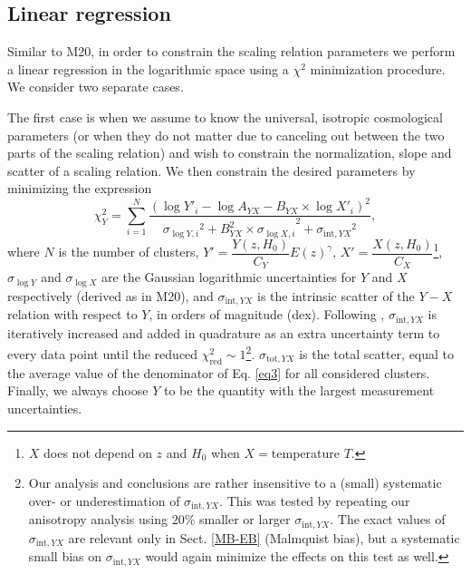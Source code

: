 \documentclass{aa}   %
\begin{document}
\subsection{Linear regression} \label{stat}

Similar to M20, in order to constrain the scaling relation parameters we perform a linear regression in the logarithmic space using a $\chi^2$ minimization procedure. We consider two separate cases. 

The first case is when we assume to know the universal, isotropic cosmological parameters (or when they do not matter due to canceling out between the two parts of the scaling relation) and wish to constrain the normalization, slope and scatter of a scaling relation. We then constrain the desired parameters by minimizing the expression
\begin{equation}
\chi^2_Y=\sum\limits_{i=1}^N\frac{\left(\log{Y'_i}-\log{A_{YX}}-B_{YX}\times \log{X'_i}\right)^2}{{\sigma _{\log{Y},i}}^2+{B_{YX}^2\times \sigma _{\log{X},i}}^2+{\sigma_{\text{int},YX}}^2},
\label{eq3}
\end{equation}
where $N$ is the number of clusters, $Y'=\dfrac{Y(z,H_0)}{C_{Y}}E(z)^{\gamma}$, $X'=\dfrac{X(z,H_0)}{C_{X}}$\footnote{$X$ does not depend on $z$ and $H_0$ when $X=$temperature $T$.}, $\sigma _{\log{Y}}$ and $\sigma _{\log{X}}$ are the Gaussian logarithmic uncertainties for $Y$ and $X$ respectively (derived as in M20), and $\sigma_{\text{int},YX}$ is the intrinsic scatter of the $Y-X$ relation with respect to $Y$, in orders of magnitude (dex). Following \citet{Maughan07}, $\sigma_{\text{int},YX}$ is iteratively increased and added in quadrature as an extra uncertainty term to every data point until the reduced $\chi^2_{\text{red}} \sim 1$\footnote{Our analysis and conclusions are rather insensitive to a (small) systematic over- or underestimation of $\sigma_{\text{int},YX}$. This was tested by repeating our anisotropy analysis using $20\%$ smaller or larger $\sigma_{\text{int},YX}$. The exact values of $\sigma_{\text{int},YX}$ are relevant only in Sect. \ref{MB-EB} (Malmquist bias), but a systematic small bias on $\sigma_{\text{int},YX}$ would again minimize the effects on this test as well.}. $\sigma_{\text{tot},YX}$ is the total scatter, equal to the average value of the denominator of Eq. \ref{eq3} for all considered clusters. Finally, we always choose $Y$ to be the quantity with the largest measurement uncertainties.
\end{document}
